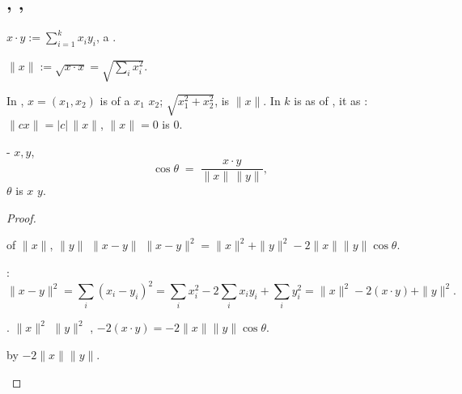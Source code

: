\subsection{  ,  ,   }

\begin{definition}
$x\cdot y := \sum_{i=1}^{k} x_i y_i$, a  .
\end{definition}

\begin{definition}[Norm]
$\|x\| := \sqrt{x\cdot x} = \sqrt{\sum_i x_i^2}$.
\end{definition}

 In  , $x=(x_1,x_2)$ is  
of a     $x_1$  $x_2$;   
$\sqrt{x_1^2+x_2^2}$,  is $\|x\|$. In $k$     is
 as  \emph{} of ,  it  as  :
$\|cx\|=|c|\,\|x\|$,  $\|x\|=0$     is $0$.

\begin{theorem}
\label{thm:cosangle}
 - $x,y$,
\[
\cos\theta \;=\; \frac{x\cdot y}{\|x\|\,\|y\|},
\]
 $\theta$ is    $x$  $y$.
\end{theorem}
\begin{proof}
\begin{steps}
\item {}  of       $\|x\|$, $\|y\|$
 $\|x-y\|$ 
$\|x-y\|^2 = \|x\|^2+\|y\|^2-2\|x\|\|y\|\cos\theta$.
\item {}      :
\[
\|x-y\|^2=\sum_i (x_i-y_i)^2=\sum_i x_i^2-2\sum_i x_iy_i+\sum_i y_i^2
=\|x\|^2-2(x\cdot y)+\|y\|^2 .
\]
\item {}    .   $\|x\|^2$  $\|y\|^2$
   ,  $-2(x\cdot y) = -2\|x\|\|y\|\cos\theta$.
\item {} by $-2\|x\|\|y\|$.
\end{steps}
\end{proof}

